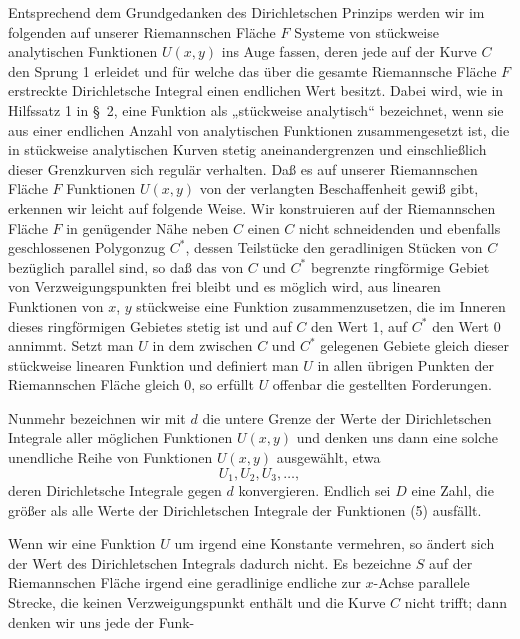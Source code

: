 \documentclass{article}
\begin{document}
Entsprechend dem Grundgedanken des Dirichletschen Prinzips werden wir im folgenden auf unserer Riemannschen Fläche $F$ Systeme von stückweise analytischen Funktionen $U(x, y)$ ins Auge fassen, deren jede auf der Kurve $C$ den Sprung 1 erleidet und für welche das über die gesamte Riemannsche Fläche $F$ erstreckte Dirichletsche Integral einen endlichen Wert besitzt. Dabei wird, wie in Hilfssatz 1 in §~2, eine Funktion als „stückweise analytisch“ bezeichnet, wenn sie aus einer endlichen Anzahl von analytischen Funktionen zusammengesetzt ist, die in stückweise analytischen Kurven stetig aneinandergrenzen und einschließlich dieser Grenzkurven sich regulär verhalten. Daß es auf unserer Riemannschen Fläche $F$ Funktionen $U(x, y)$ von der verlangten Beschaffenheit gewiß gibt, erkennen wir leicht auf folgende Weise. Wir konstruieren auf der Riemannschen Fläche $F$ in genügender Nähe neben $C$ einen $C$ nicht schneidenden und ebenfalls geschlossenen Polygonzug $C^*$, dessen Teilstücke den geradlinigen Stücken von $C$ bezüglich parallel sind, so daß das von $C$ und $C^*$ begrenzte ringförmige Gebiet von Verzweigungspunkten frei bleibt und es möglich wird, aus linearen Funktionen von $x$, $y$ stückweise eine Funktion zusammenzusetzen, die im Inneren dieses ringförmigen Gebietes stetig ist und auf $C$ den Wert 1, auf $C^*$ den Wert 0 annimmt. Setzt man $U$ in dem zwischen $C$ und $C^*$ gelegenen Gebiete gleich dieser stückweise linearen Funktion und definiert man $U$ in allen übrigen Punkten der Riemannschen Fläche gleich 0, so erfüllt $U$ offenbar die gestellten Forderungen.

Nunmehr bezeichnen wir mit $d$ die untere Grenze der Werte der Dirichletschen Integrale aller möglichen Funktionen $U(x, y)$ und denken uns dann eine solche unendliche Reihe von Funktionen $U(x, y)$ ausgewählt, etwa
\[
U_1, U_2, U_3, \dots, \tag{5}
\]
deren Dirichletsche Integrale gegen $d$ konvergieren. Endlich sei $D$ eine Zahl, die größer als alle Werte der Dirichletschen Integrale der Funktionen (5) ausfällt.

Wenn wir eine Funktion $U$ um irgend eine Konstante vermehren, so ändert sich der Wert des Dirichletschen Integrals dadurch nicht. Es bezeichne $S$ auf der Riemannschen Fläche irgend eine geradlinige endliche zur $x$-Achse parallele Strecke, die keinen Verzweigungspunkt enthält und die Kurve $C$ nicht trifft; dann denken wir uns jede der Funk-
\end{document}
